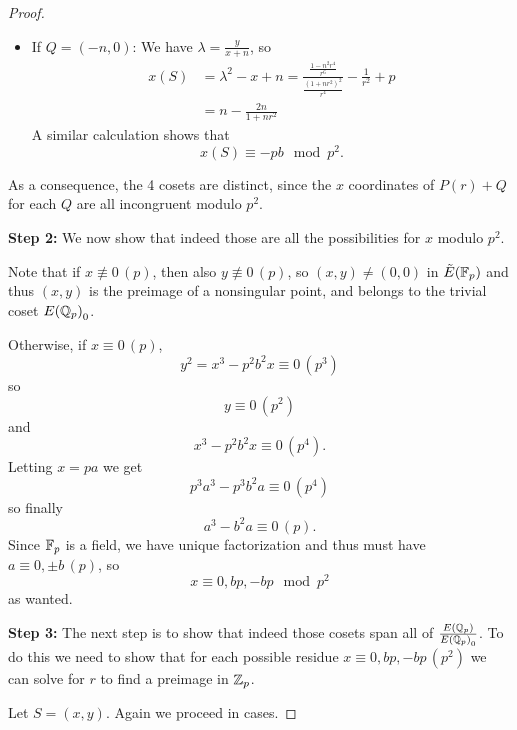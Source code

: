 \documentclass[12pt, a4paper]{report}
\begin{document}
\begin{proof}
\begin{itemize}
  \item If $Q = (-n, 0)$: We have $\lambda = \frac{y}{x+n}$, so
  \begin{equation*}
    \begin{split}
      x(S)
      &= \lambda^2 - x + n = 
      \frac{\frac{1 - n^2r^4}{r^6}}{\frac{(1+nr^2)^2}{r^4}} -
      \frac{1}{r^2} + p \\
      &= n - \frac{2n}{1+nr^2}
    \end{split}
  \end{equation*}
  A similar calculation shows that 
  \[x(S) \equiv -pb \mod{p^2}.\]
  \end{itemize}

  As a consequence, the 4 cosets are distinct, since the $x$ coordinates of
  $P(r) + Q$ for each $Q$ are all incongruent modulo $p^2$.

  \textbf{Step 2:} We now show that indeed those are all the possibilities for $x$ modulo $p^2$.

  Note that if $x \not\equiv 0 \, (p)$, then also $y \not\equiv 0 \, (p)$, so
  $(x,y) \neq (0,0)$ in ${\tilde{E}(\mathbb{F}_p)}$ and thus $(x,y)$ is the preimage of a nonsingular
  point, and belongs to the trivial coset ${E({\mathbb Q}_p)}_0$.

  Otherwise, if $x \equiv 0 \, (p)$,
  \[y^2 = x^3 - p^2b^2x\equiv 0 \,(p^3)\]
  so
  \[y \equiv 0 \, (p^2)\]
  and
  \[ x^3-p^2b^2x \equiv 0 \, (p^4).\]
  Letting $x = pa$ we get
  \[p^3a^3-p^3b^2a \equiv 0 \, (p^4)\]
  so finally
  \[a^3 - b^2a \equiv 0 \, (p).\]
  Since $\mathbb{F}_p$ is a field, we have unique factorization and thus must have
  $a \equiv 0, \pm b \, (p)$, so
  \[x \equiv 0, bp, -bp \mod{p^2}\]
  as wanted.

  \textbf{Step 3:} The next step is to show that indeed those cosets span all of
  $\frac{{E({\mathbb Q}_p)}}{{E({\mathbb Q}_p)}_0}$. To do this we need to show that for each possible
  residue $x \equiv 0, bp, -bp \, (p^2)$ we can solve for $r$ to find a preimage
  in ${\mathbb Z}_p$.

  Let $S = (x,y).$ Again we proceed in cases.


\end{proof}
\end{document}
